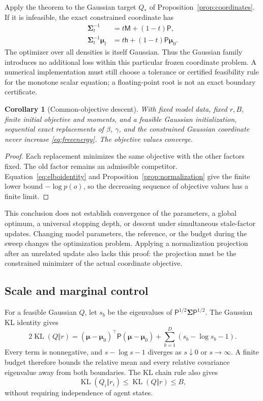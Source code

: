 \documentclass[11pt]{article}
\newtheorem{corollary}[theorem]{Corollary}
\newcommand{\KL}{\operatorname{KL}}
\newcommand{\m}{\boldsymbol{\mu}}
\newcommand{\Sig}{\boldsymbol{\Sigma}}
\begin{document}
Apply the theorem to the Gaussian target $Q_*$ of Proposition~\ref{prop:coordinates}. If it is infeasible, the exact constrained coordinate has
\begin{align}
\Sig_t^{-1}&=t\mathsf M+(1-t)\mathsf P,\label{eq:budgetprecision}\\
\Sig_t^{-1}\m_t&=t\mathsf h+(1-t)\mathsf P\m_0.
\label{eq:budgetmean}
\end{align}
The optimizer over all densities is itself Gaussian. Thus the Gaussian family introduces no additional loss within this particular frozen coordinate problem. A numerical implementation must still choose a tolerance or certified feasibility rule for the monotone scalar equation; a floating-point root is not an exact boundary certificate.

\begin{corollary}[Common-objective descent]
\label{cor:descent}
With fixed model data, fixed $r,B$, finite initial objective and moments, and a feasible Gaussian initialization, sequential exact replacements of $\beta$, $\gamma$, and the constrained Gaussian coordinate never increase \eqref{eq:freeenergy}. The objective values converge.
\end{corollary}
\begin{proof}
Each replacement minimizes the same objective with the other factors fixed. The old factor remains an admissible competitor. Equation~\eqref{eq:elboidentity} and Proposition~\ref{prop:normalization} give the finite lower bound $-\log p(o)$, so the decreasing sequence of objective values has a finite limit.
\end{proof}

This conclusion does not establish convergence of the parameters, a global optimum, a universal stopping depth, or descent under simultaneous stale-factor updates. Changing model parameters, the reference, or the budget during the sweep changes the optimization problem. Applying a normalization projection after an unrelated update also lacks this proof: the projection must be the constrained minimizer of the actual coordinate objective.

\subsection{Scale and marginal control}

For a feasible Gaussian $Q$, let $s_b$ be the eigenvalues of $\mathsf P^{1/2}\Sig\mathsf P^{1/2}$. The Gaussian KL identity gives
\begin{equation}
2\KL(Q\Vert r)=(\m-\m_0)^\top\mathsf P(\m-\m_0)
+\sum_{b=1}^D(s_b-\log s_b-1).
\label{eq:spectralbound}
\end{equation}
Every term is nonnegative, and $s-\log s-1$ diverges as $s\downarrow0$ or $s\to\infty$. A finite budget therefore bounds the relative mean and every relative covariance eigenvalue away from both boundaries. The KL chain rule also gives
\begin{equation}
\KL(Q_i\Vert r_i)\le\KL(Q\Vert r)\le B,
\label{eq:marginalbudget}
\end{equation}
without requiring independence of agent states.
\end{document}
